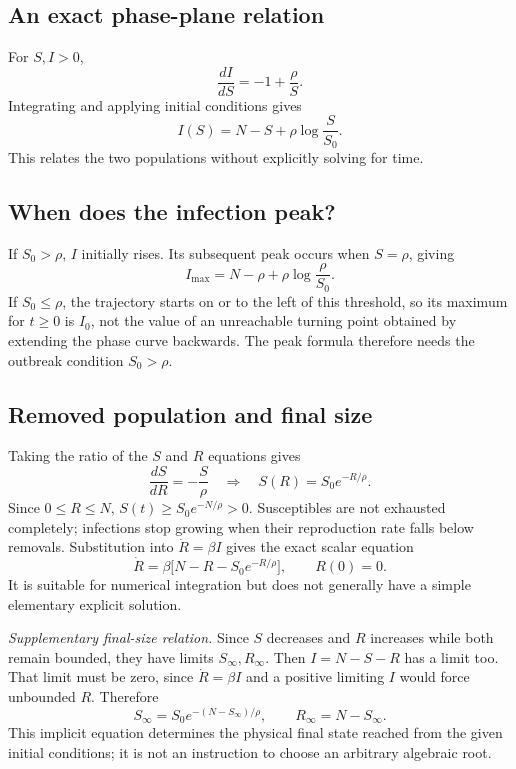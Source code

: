 \subsection{An exact phase-plane relation}
For $S,I>0$,
\[
\frac{dI}{dS}=-1+\frac\rho S.
\]
Integrating and applying initial conditions gives
\begin{equation}\label{eq:applied-sir-phase}
I(S)=N-S+\rho\log\frac S{S_0}.
\end{equation}
This relates the two populations without explicitly solving for time.


\subsection{When does the infection peak?}
If $S_0>\rho$, $I$ initially rises. Its subsequent peak occurs when
$S=\rho$, giving
\[
I_{\max}=N-\rho+\rho\log\frac\rho{S_0}.
\]
If $S_0\leq\rho$, the trajectory starts on or to the left of this threshold,
so its maximum for $t\geq0$ is $I_0$, not the value of an unreachable
turning point obtained by extending the phase curve backwards.
The peak formula therefore needs the outbreak condition $S_0>\rho$.

\subsection{Removed population and final size}
Taking the ratio of the $S$ and $R$ equations gives
\[
\frac{dS}{dR}=-\frac S\rho
\quad\Longrightarrow\quad S(R)=S_0e^{-R/\rho}.
\]
Since $0\leq R\leq N$,
$S(t)\geq S_0e^{-N/\rho}>0$. Susceptibles are not exhausted completely;
infections stop growing when their reproduction rate falls below removals.
Substitution into $\dot R=\beta I$ gives the exact scalar equation
\begin{equation}\label{eq:applied-sir-R}
\dot R=\beta\bigl[N-R-S_0e^{-R/\rho}\bigr],\qquad R(0)=0.
\end{equation}
It is suitable for numerical integration but does not generally have a
simple elementary explicit solution.

\textit{Supplementary final-size relation.} Since $S$ decreases and $R$
increases while both remain bounded, they have limits $S_\infty,R_\infty$.
Then $I=N-S-R$ has a limit too. That limit must be zero, since
$\dot R=\beta I$ and a positive limiting $I$ would force unbounded $R$.
Therefore
\[
S_\infty=S_0e^{-(N-S_\infty)/\rho},\qquad R_\infty=N-S_\infty.
\]
This implicit equation determines the physical final state reached from
the given initial conditions; it is not an instruction to choose an
arbitrary algebraic root.

